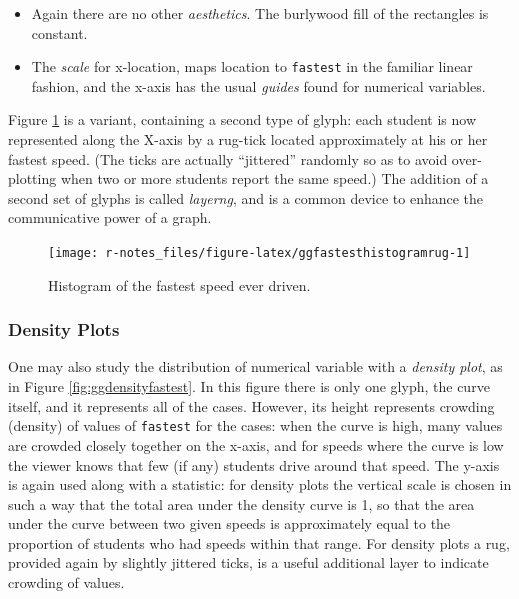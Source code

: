 \documentclass[]{book}
\providecommand{\tightlist}{%
  \setlength{\itemsep}{0pt}\setlength{\parskip}{0pt}}
\theoremstyle{definition}
\theoremstyle{definition}
\theoremstyle{definition}
\theoremstyle{remark}
\begin{document}
{\begin{itemize}
  \begin{itemize}
  \tightlist
  \item
    x = \texttt{fastest}.
  \item
    As with our bar graphs, the y-location does not count as part of the
    frame, but instead represents a statistic, permitting the height of
    a rectangle to indicate the number of cases that it represents.
  \end{itemize}
\item
  Again there are no other \emph{aesthetics}. The burlywood fill of the
  rectangles is constant.
\item
  The \emph{scale} for x-location, maps location to \texttt{fastest} in
  the familiar linear fashion, and the x-axis has the usual
  \emph{guides} found for numerical variables.
\end{itemize}

Figure \ref{fig:ggfastesthistogramrug} is a variant, containing a second
type of glyph: each student is now represented along the X-axis by a
rug-tick located approximately at his or her fastest speed. (The ticks
are actually ``jittered'' randomly so as to avoid over-plotting when two
or more students report the same speed.) The addition of a second set of
glyphs is called \emph{layerng}, and is a common device
to enhance the communicative power of a graph.

\begin{figure}

{\centering \texttt{[image: r-notes\_files/figure-latex/ggfastesthistogramrug-1]} 

}

\caption{Histogram of the fastest speed ever driven.}\label{fig:ggfastesthistogramrug}
\end{figure}

\subsubsection{Density Plots}\label{graphics-density-plots}

One may also study the distribution of numerical variable with a
\emph{density plot}, as in Figure \ref{fig:ggdensityfastest}. In this
figure there is only one glyph, the curve itself, and it represents all
of the cases. However, its height represents crowding (density) of
values of \texttt{fastest} for the cases: when the curve is high, many
values are crowded closely together on the x-axis, and for speeds where
the curve is low the viewer knows that few (if any) students drive
around that speed. The y-axis is again used along with a statistic: for
density plots the vertical scale is chosen in such a way that the total
area under the density curve is 1, so that the area under the curve
between two given speeds is approximately equal to the proportion of
students who had speeds within that range. For density plots a rug,
provided again by slightly jittered ticks, is a useful additional layer
to indicate crowding of values.

}
\end{document}
